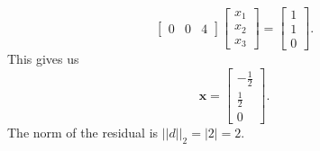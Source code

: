 \documentclass[letterpaper]{article}
\newcommand{\0}{\mathbf{0}}
\newcommand{\x}{\mathbf{x}}
\begin{document}
\begin{mdframed}
\[\begin{bmatrix}
        0 & 0 & 4
    \end{bmatrix} \begin{bmatrix}
        x_1 \\ x_2 \\ x_3
    \end{bmatrix} = \begin{bmatrix}
        1 \\ 1 \\ 0
    \end{bmatrix}.\] This gives us \[\x = \begin{bmatrix}
        -\frac{1}{2} \\ \frac{1}{2} \\ 0
    \end{bmatrix}.\]
    The norm of the residual is $||d||_2 = |2| = 2$. 
\end{mdframed}
\end{document}
